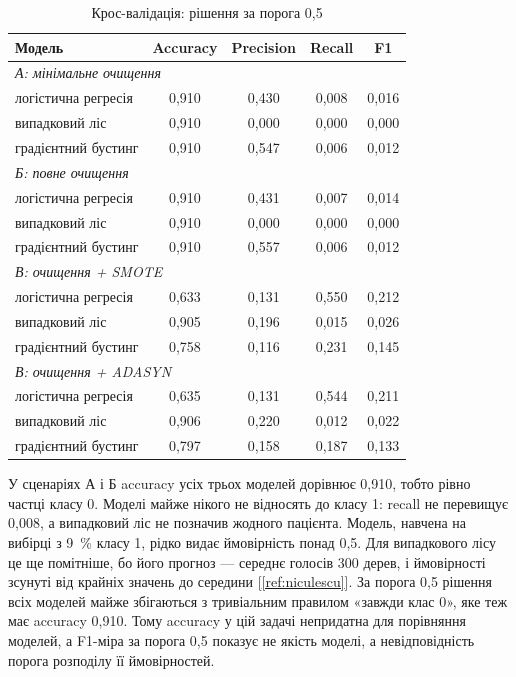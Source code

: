 \documentclass[14pt,a4paper]{extreport}
\begin{document}
\begin{table}[H]
\caption{Крос-валідація: рішення за порога 0,5}
\label{tab:cv_05}
\small
\renewcommand{\arraystretch}{1.15}
\begin{tabularx}{\linewidth}{|X|c|c|c|c|}
\hline
\textbf{Модель} & \textbf{Accuracy} & \textbf{Precision} & \textbf{Recall} & \textbf{F1} \\
\hline
\multicolumn{5}{|l|}{\textit{А: мінімальне очищення}} \\
\hline
логістична регресія & 0,910 & 0,430 & 0,008 & 0,016 \\
\hline
випадковий ліс & 0,910 & 0,000 & 0,000 & 0,000 \\
\hline
градієнтний бустинг & 0,910 & 0,547 & 0,006 & 0,012 \\
\hline
\multicolumn{5}{|l|}{\textit{Б: повне очищення}} \\
\hline
логістична регресія & 0,910 & 0,431 & 0,007 & 0,014 \\
\hline
випадковий ліс & 0,910 & 0,000 & 0,000 & 0,000 \\
\hline
градієнтний бустинг & 0,910 & 0,557 & 0,006 & 0,012 \\
\hline
\multicolumn{5}{|l|}{\textit{В: очищення + SMOTE}} \\
\hline
логістична регресія & 0,633 & 0,131 & 0,550 & 0,212 \\
\hline
випадковий ліс & 0,905 & 0,196 & 0,015 & 0,026 \\
\hline
градієнтний бустинг & 0,758 & 0,116 & 0,231 & 0,145 \\
\hline
\multicolumn{5}{|l|}{\textit{В: очищення + ADASYN}} \\
\hline
логістична регресія & 0,635 & 0,131 & 0,544 & 0,211 \\
\hline
випадковий ліс & 0,906 & 0,220 & 0,012 & 0,022 \\
\hline
градієнтний бустинг & 0,797 & 0,158 & 0,187 & 0,133 \\
\hline
\end{tabularx}
\end{table}

У сценаріях А і Б accuracy усіх трьох моделей дорівнює 0,910, тобто рівно частці класу 0. Моделі майже нікого не відносять до класу 1: recall не перевищує 0,008, а випадковий ліс не позначив жодного пацієнта. Модель, навчена на вибірці з 9~\% класу 1, рідко видає ймовірність понад 0,5. Для випадкового лісу це ще помітніше, бо його прогноз --- середнє голосів 300 дерев, і ймовірності зсунуті від крайніх значень до середини [\ref{ref:niculescu}]. За порога 0,5 рішення всіх моделей майже збігаються з тривіальним правилом «завжди клас 0», яке теж має accuracy 0,910. Тому accuracy у цій задачі непридатна для порівняння моделей, а F1-міра за порога 0,5 показує не якість моделі, а невідповідність порога розподілу її ймовірностей.
\end{document}
